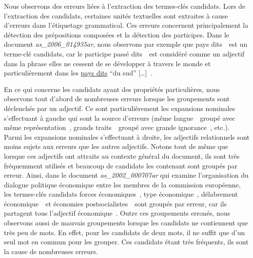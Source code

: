     Nous observons des erreurs liées à l'extraction des termes-clés candidats.
    Lors de l'extraction des candidats, certaines unités textuelles sont
    extraites à cause d'erreurs dans l'étiquetage grammatical. Ces erreurs
    concernent principalement la détection des prépositions composées et la
    détection des participes. Dans le document \textit{as\_2006\_014935ar}, nous
    observons par exemple que \og pays dits~\fg\ est un terme-clé candidats, car
    le participe passé \og dits~\fg\ est considéré comme un adjectif dans la
    phrase \og [\dots] elles ne cessent de se développer à travers le monde et
    particulièrement dans les \underline{pays dits} ``du sud'' [\dots]~\fg.

    En ce qui concerne les candidats ayant des propriétés particulières, nous
    observons tout d'abord de nombreuses erreurs lorsque les groupements sont
    déclenchés par un adjectif. Ce sont particulièrement les expansions
    nominales s'effectuant à gauche qui sont la source d'erreurs (\og même
    langue~\fg\ groupé avec \og même représentation~\fg, \og grands
    traits~\fg\ groupé avec \og grande ignorance~\fg, etc.). Parmi les
    expansions nominales s'effectuant à droite, les adjectifs relationnels sont
    moins sujets aux erreurs que les autres adjectifs. Notons tout de même que
    lorsque ces adjectifs ont attraits au contexte général du document, ils sont
    très fréquemment utilisés et beaucoup de candidats les contenant sont
    groupés par erreur. Ainsi, dans le document \textit{as\_2002\_000707ar} qui
    examine l'organisation du dialogue politique économique entre les membres de
    la commission européenne, les termes-clés candidats \og forces
    économiques~\fg, \og type économique~\fg, \og délabrement économique~\fg\ et
    \og économies postsocialistes~\fg\ sont groupés par erreur, car ils
    partagent tous l'adjectif \og économique~\fg. Outre ces groupements erronés,
    nous observons aussi de mauvais groupements lorsque les candidats ne
    contiennent que très peu de mots. En effet, pour les candidats de deux mots,
    il ne suffit que d'un seul mot en commun pour les grouper. Ces candidats
    étant très fréquents, ils sont la cause de nombreuses erreurs.


